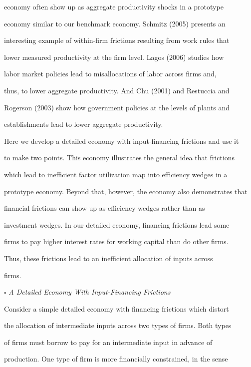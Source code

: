 \documentclass[fleqn,leqno,11pt]{article}
\begin{document}
economy often show up as aggregate productivity shocks in a prototype

economy similar to our benchmark economy. Schmitz (2005) presents an

interesting example of within-firm frictions resulting from work rules that

lower measured productivity at the firm level. Lagos (2006) studies how

labor market policies lead to misallocations of labor across firms and,

thus, to lower aggregate productivity. And Chu (2001) and Restuccia and

Rogerson (2003) show how government policies at the levels of plants and

establishments lead to lower aggregate productivity.



Here we develop a detailed economy with input-financing frictions and use it

to make two points. This economy illustrates the general idea that frictions

which lead to inefficient factor utilization map into efficiency wedges in a

prototype economy. Beyond that, however, the economy also demonstrates that

financial frictions can show up as efficiency wedges rather than as

investment wedges. In our detailed economy, financing frictions lead some

firms to pay higher interest rates for working capital than do other firms.

Thus, these frictions lead to an inefficient allocation of inputs across

firms.



\bigskip



\noindent $\square $ \emph{A Detailed Economy With Input-Financing Frictions}



Consider a simple detailed economy with financing frictions which distort

the allocation of intermediate inputs across two types of firms. Both types

of firms must borrow to pay for an intermediate input in advance of

production. One type of firm is more financially constrained, in the sense
\end{document}
